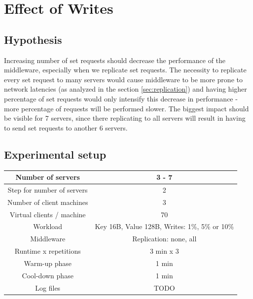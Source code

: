 \documentclass[11pt]{article}
\begin{document}
\clearpage


\section{Effect of Writes}
\label{sec:writes}

\subsection{Hypothesis}

Increasing number of set requests should decrease the performance of the middleware, especially when we replicate set requests. The necessity to replicate every set request to many servers would cause middleware to be more prone to network latencies (as analyzed in the section \ref{sec:replication}) and having higher percentage of set requests would only intensify this decrease in performance - more percentage of requests will be performed slower. The biggest impact should be visible for 7 servers, since there replicating to all servers will result in having to send set requests to another 6 servers.

\subsection{Experimental setup}

\small{
\smallskip
\begin{tabular}{|c|c|}
\hline Number of servers & 3 - 7 \\ 
\hline Step for number of servers & 2 \\
\hline Number of client machines & 3 \\ 
\hline Virtual clients / machine &  70 \\ 
\hline Workload & Key 16B, Value 128B, Writes: 1\%, 5\% or 10\% \\
\hline Middleware & Replication: none, all \\ 
\hline Runtime x repetitions & 3 min x 3 \\
\hline Warm-up phase & 1 min \\
\hline Cool-down phase & 1 min \\
\hline Log files & TODO \\
\hline 
\end{tabular} }
\medskip
\end{document}
